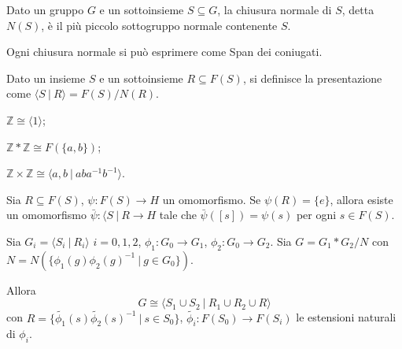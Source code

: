 \begin{defn}
    Dato un gruppo $G$ e un sottoinsieme $S\subseteq G$, la chiusura normale di $S$, detta $N(S)$, \`e il pi\`u piccolo sottogruppo normale contenente $S$.
\end{defn}

\begin{oss}
    Ogni chiusura normale si pu\`o esprimere come Span dei coniugati.
\end{oss}

\begin{defn}
    Dato un insieme $S$ e un sottoinsieme $R\subseteq F(S)$, si definisce la presentazione come $\langle S \ |\ R\rangle = F(S)/N(R)$.
\end{defn}

\begin{ex}
    \begin{nlist}
        \item $\mathbb{Z} \cong \langle 1 \rangle$;
        \item $\mathbb{Z}*\mathbb{Z}\cong F(\{a,b\})$;
        \item $\mathbb{Z}\times\mathbb{Z}\cong\langle a,b\ |\ aba^{-1}b^{-1}\rangle$.
    \end{nlist}
\end{ex}

\begin{prop}
    Sia $R\subseteq F(S)$, $\psi\colon F(S)\rightarrow H$ un omomorfismo. Se $\psi(R)=\{e\}$, allora esiste un omomorfismo $\bar{\psi}\colon \langle S\ |\ R \rightarrow H$ tale che $\bar{\psi}([s])=\psi(s)$ per ogni $s\in F(S)$.
\end{prop}

\begin{prop}
    Sia $G_i = \langle S_i\ |\ R_i\rangle$ $i=0,1,2$, $\phi_1\colon G_0 \rightarrow G_1$, $\phi_2\colon G_0\rightarrow G_2$. Sia $G = G_1 * G_2 /N$ con $N = N(\{\phi_1(g)\phi_2(g)^{-1}\ |\ g\in G_0\})$.

    Allora $$G\cong \langle S_1 \cup S_2\ |\ R_1\cup R_2\cup R\rangle$$ con $R =\{\tilde{\phi_1}(s)\tilde{\phi_2}(s)^{-1}\ |\ s\in S_0\}$, $\tilde{\phi_i}\colon F(S_0)\rightarrow F(S_i)$ le estensioni naturali di $\phi_i$.
\end{prop}
